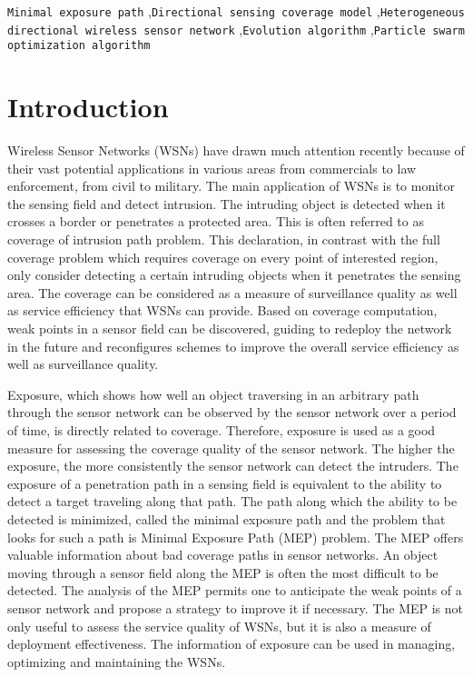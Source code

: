 \documentclass[final]{elsarticle}
\begin{document}
\begin{frontmatter}
\begin{abstract}
\end{abstract}
\begin{keyword}
\texttt{Minimal exposure path} \sep \texttt{Directional sensing coverage model} \sep \texttt{Heterogeneous directional wireless sensor network} \sep \texttt{Evolution algorithm} \sep\texttt{Particle swarm optimization algorithm}
\end{keyword}
\end{frontmatter}
\section{Introduction}
Wireless Sensor Networks (WSNs) have drawn much attention recently because of their vast potential applications in various areas from commercials to law enforcement, from civil to military. The main application of WSNs is to monitor the sensing field and detect intrusion. The intruding object is detected when it crosses a border or penetrates a protected area. This is often referred to as coverage of intrusion path problem. This declaration, in contrast with the full coverage problem which requires coverage on every point of interested region, only consider detecting a certain intruding objects when it penetrates the sensing area. The coverage can be considered as a measure of surveillance quality as well as service efficiency that WSNs can provide. Based on coverage computation, weak points in a sensor field can be discovered, guiding to redeploy the network in the future and reconfigures schemes to improve the overall service efficiency as well as surveillance quality.

Exposure, which shows how well an object traversing in an arbitrary path through the sensor network can be observed by the sensor network over a period of time, is directly related to coverage. Therefore, exposure is used as a good measure for assessing the coverage quality of the sensor network. The higher the exposure, the more consistently the sensor network can detect the intruders. The exposure of a penetration path in a sensing field is equivalent to the ability to detect a target traveling along that path. The path along which the ability to be detected is minimized, called the minimal exposure path and the problem that looks for such a path is Minimal Exposure Path (MEP) problem. The MEP offers valuable information about bad coverage paths in sensor networks. An object moving through a sensor field along the MEP is often the most difficult to be detected. The analysis of the MEP permits one to anticipate the weak points of a sensor network and propose a strategy to improve it if necessary. The MEP is not only useful to assess the service quality of WSNs, but it is also a measure of deployment effectiveness. The information of exposure can be used in managing, optimizing and maintaining the WSNs.
\end{document}
